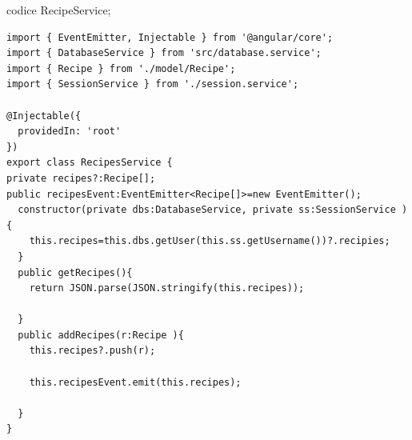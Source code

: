 \newpage
codice RecipeService;
\begin{verbatim}
import { EventEmitter, Injectable } from '@angular/core';
import { DatabaseService } from 'src/database.service';
import { Recipe } from './model/Recipe';
import { SessionService } from './session.service';

@Injectable({
  providedIn: 'root'
})
export class RecipesService {
private recipes?:Recipe[];
public recipesEvent:EventEmitter<Recipe[]>=new EventEmitter();
  constructor(private dbs:DatabaseService, private ss:SessionService ) { 
    this.recipes=this.dbs.getUser(this.ss.getUsername())?.recipies;
  }
  public getRecipes(){
    return JSON.parse(JSON.stringify(this.recipes));

  }
  public addRecipes(r:Recipe ){
    this.recipes?.push(r);
   
    this.recipesEvent.emit(this.recipes);
    
  }
}
\end{verbatim}
